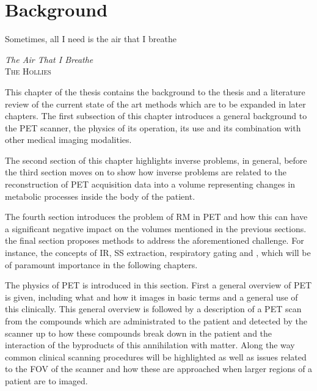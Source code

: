 \chapter{Background} \label{sec:background}
    \vspace*{\fill}
    \setlength{\epigraphwidth}{0.5\linewidth}
    \renewcommand{\epigraphflush}{flushright}
    \renewcommand{\epigraphsize}{\footnotesize}
    \epigraph{Sometimes, all I need is the air that I breathe}%
              {\textit{The Air That I Breathe}\\ \textsc{The Hollies}}
    
    \newpage
    
        This chapter of the thesis contains the background to the thesis and a literature review of the current state of the art methods which are to be expanded in later chapters. The first subsection of this chapter introduces a general background to the \gls{PET} scanner, the physics of its operation, its use and its combination with other medical imaging modalities.
        
        The second section of this chapter highlights inverse problems, in general, before the third section moves on to show how inverse problems are related to the reconstruction of \gls{PET} acquisition data into a volume representing changes in metabolic processes inside the body of the patient.
        
        The fourth section introduces the problem of \gls{RM} in \gls{PET} and how this can have a significant negative impact on the volumes mentioned in the previous sections. the final section proposes methods to address the aforementioned challenge. For instance, the concepts of \gls{IR}, \gls{SS} extraction, respiratory gating and , which will be of paramount importance in the following chapters.
    
        The physics of \gls{PET} is introduced in this section. First a general overview of \gls{PET} is given, including what and how it images in basic terms and a general use of this clinically. This general overview is followed by a description of a \gls{PET} scan from the compounds which are administrated to the patient and detected by the scanner up to how these compounds break down in the patient and the interaction of the byproducts of this annihilation with matter. Along the way common clinical scanning procedures will be highlighted as well as issues related to the \gls{FOV} of the scanner and how these are approached when larger regions of a patient are to imaged.
            
